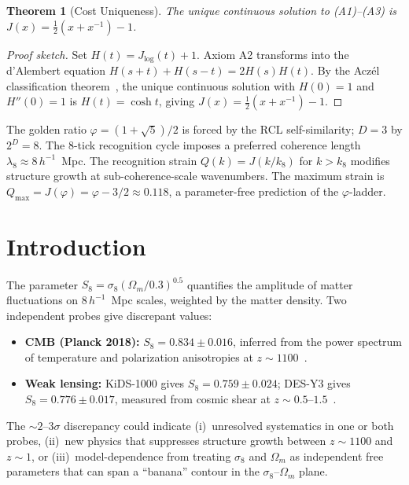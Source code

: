 \documentclass[12pt,a4paper]{article}
\newtheorem{theorem}{Theorem}[section]
\theoremstyle{definition}
\theoremstyle{remark}
\begin{document}
\begin{theorem}[Cost Uniqueness]
\label{thm:unique}
The unique continuous solution to \textup{(A1)--(A3)} is
$J(x) = \tfrac{1}{2}(x + x^{-1}) - 1$.
\end{theorem}

\begin{proof}[Proof sketch]
Set $H(t) = J_{\log}(t)+1$.  Axiom A2 transforms into the d'Alembert
equation $H(s+t)+H(s-t)=2H(s)H(t)$.  By the Acz\'el classification
theorem~\cite{Aczel1966}, the unique continuous solution with $H(0)=1$
and $H''(0)=1$ is $H(t)=\cosh t$, giving
$J(x)=\tfrac{1}{2}(x+x^{-1})-1$.
\end{proof}

\noindent The golden ratio $\varphi=(1+\sqrt{5})/2$ is forced by the RCL
self-similarity; $D=3$ by $2^D=8$.  The 8-tick recognition cycle imposes
a preferred coherence length $\lambda_8 \approx 8\,h^{-1}$~Mpc.  The
recognition strain $Q(k) = J(k/k_8)$ for $k > k_8$ modifies structure
growth at sub-coherence-scale wavenumbers.  The maximum strain is
$Q_{\max} = J(\varphi) = \varphi - 3/2 \approx 0.118$, a
parameter-free prediction of the $\varphi$-ladder.

\section{Introduction}
\label{sec:intro}

The parameter $S_8 = \sigma_8 (\Omega_m/0.3)^{0.5}$ quantifies the
amplitude of matter fluctuations on $8\,h^{-1}$~Mpc scales, weighted
by the matter density.  Two independent probes give discrepant values:

\begin{itemize}[nosep]
  \item \textbf{CMB (Planck 2018):} $S_8 = 0.834 \pm 0.016$,
  inferred from the power spectrum of temperature and polarization
  anisotropies at $z \sim 1100$~\cite{Planck2020}.

  \item \textbf{Weak lensing:} KiDS-1000 gives $S_8 = 0.759 \pm
  0.024$; DES-Y3 gives $S_8 = 0.776 \pm 0.017$, measured from
  cosmic shear at $z \sim 0.5$--$1.5$~\cite{Asgari2021,DES2022}.
\end{itemize}

The $\sim 2$--$3\sigma$ discrepancy could indicate (i)~unresolved
systematics in one or both probes, (ii)~new physics that suppresses
structure growth between $z \sim 1100$ and $z \sim 1$, or
(iii)~model-dependence from treating $\sigma_8$ and $\Omega_m$ as
independent free parameters that can span a ``banana'' contour in
the $\sigma_8$--$\Omega_m$ plane.
\end{document}
